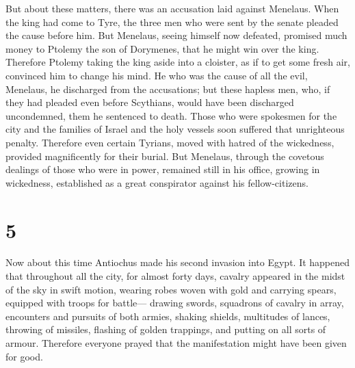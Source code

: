  But about these matters, there was an accusation laid
against Menelaus.  When the king had come to Tyre, the
three men who were sent by the senate pleaded the cause before him.
 But Menelaus, seeing himself now defeated, promised much
money to Ptolemy the son of Dorymenes, that he might win over the king.
 Therefore Ptolemy taking the king aside into a cloister,
as if to get some fresh air, convinced him to change his mind.
 He who was the cause of all the evil, Menelaus, he
discharged from the accusations; but these hapless men, who, if they had
pleaded even before Scythians, would have been discharged uncondemned,
them he sentenced to death.  Those who were spokesmen for
the city and the families of Israel and the holy vessels soon suffered
that unrighteous penalty.  Therefore even certain Tyrians,
moved with hatred of the wickedness, provided magnificently for their
burial.  But Menelaus, through the covetous dealings of
those who were in power, remained still in his office, growing in
wickedness, established as a great conspirator against his
fellow-citizens.

\hypertarget{section-3}{%
\section{5}\label{section-3}}

 Now about this time Antiochus made his second invasion into
Egypt.  It happened that throughout all the city, for almost
forty days, cavalry appeared in the midst of the sky in swift motion,
wearing robes woven with gold and carrying spears, equipped with troops
for battle---  drawing swords, squadrons of cavalry in
array, encounters and pursuits of both armies, shaking shields,
multitudes of lances, throwing of missiles, flashing of golden
trappings, and putting on all sorts of armour.  Therefore
everyone prayed that the manifestation might have been given for good.

